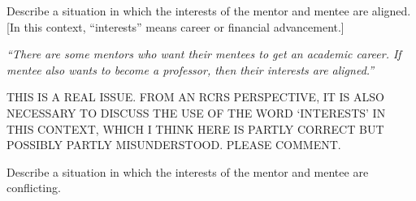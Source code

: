\documentclass[portrait,11pt]{seminar}
\begin{document}
\bs

  Describe a situation in which the interests of the mentor and mentee are aligned. [In this context, ``interests'' means career or financial advancement.]


\medskip

{\it ``There are some mentors who want their mentees to get an academic career. If mentee also wants to become a professor, then their interests are aligned.''}


\medskip

THIS IS A REAL ISSUE. FROM AN RCRS PERSPECTIVE, IT IS ALSO NECESSARY TO DISCUSS THE USE OF THE WORD `INTERESTS' IN THIS CONTEXT, WHICH I THINK HERE IS PARTLY CORRECT BUT POSSIBLY PARTLY MISUNDERSTOOD. PLEASE COMMENT.





\es 


%
%
%
%
%
%

%
%

\bs

  Describe a situation in which the interests of the mentor and mentee are conflicting. 
\end{document}
